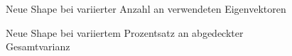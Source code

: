 \documentclass[]{report}
\newlength\figureheight
\newlength\figurewidth
\begin{document}
\begin{enumerate}
\begin{enumerate}
			\setlength\figureheight{3.5cm}
			\setlength{}
			\begin{figure}
				\centering
				
				\caption{Neue Shape bei variierter Anzahl an verwendeten Eigenvektoren}
				\label{fig:shapesK}
			\end{figure}
			\qquad
			\begin{figure}
				\centering
				
				\caption{Neue Shape bei variiertem Prozentsatz an abgedeckter Gesamtvarianz}
				\label{fig:shapesVar}
			\end{figure}
		\end{enumerate}
	\end{enumerate}
	
\end{document}
